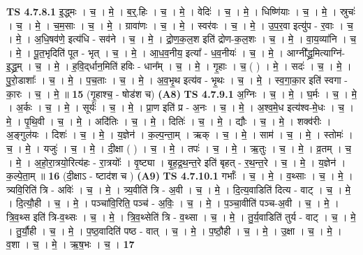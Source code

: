 \documentclass[17pt]{extarticle}
\begin{document}
                                \textbf{ TS 4.7.8.1} \newline
                  इ॒द्ध्मः । च॒ । मे॒ । ब॒र्॒.हिः । च॒ । मे॒ । वेदिः॑ । च॒ । मे॒ । धिष्णि॑याः । च॒ । मे॒ । स्रुचः॑ । च॒ । मे॒ । च॒म॒साः । च॒ । मे॒ । ग्रावा॑णः । च॒ । मे॒ । स्वर॑वः । च॒ । मे॒ । उ॒प॒र॒वा इत्यु॑प - र॒वाः । च॒ । मे॒ । अ॒धि॒षव॑णे॒ इत्य॑धि - सव॑ने । च॒ । मे॒ । द्रो॒ण॒क॒ल॒श इति॑ द्रोण-क॒ल॒शः । च॒ । मे॒ । वा॒य॒व्या॑नि । च॒ । मे॒ । पू॒त॒भृदिति॑ पूत - भृत् । च॒ । मे॒ । आ॒ध॒व॒नीय॒ इत्या᳚ - ध॒व॒नीयः॑ । च॒ । मे॒ । आग्नी᳚द्ध्र॒मित्याग्नि॑-इ॒द्ध्र॒म् । च॒ । मे॒ । ह॒वि॒द्‌र्धान॒मिति॑ हविः - धान᳚म् । च॒ । मे॒ । गृ॒हाः । च॒ ( ) । मे॒ । सदः॑ । च॒ । मे॒ । पु॒रो॒डाशाः᳚ । च॒ । मे॒ । प॒च॒ताः । च॒ । मे॒ । अ॒व॒भृ॒थ इत्य॑व - भृ॒थः । च॒ । मे॒ । स्व॒गा॒का॒र इति॑ स्वगा - का॒रः । च॒ । मे॒ ॥ \textbf{  15} \newline
                  \newline
                      (गृ॒हाश्च॒ - षोड॑श च)  \textbf{(A8)} \newline \newline
                                \textbf{ TS 4.7.9.1} \newline
                  अ॒ग्निः । च॒ । मे॒ । घ॒र्मः । च॒ । मे॒ । अ॒र्कः । च॒ । मे॒ । सूर्यः॑ । च॒ । मे॒ । प्रा॒ण इति॑ प्र - अ॒नः । च॒ । मे॒ । अ॒श्व॒मे॒ध इत्य॑श्व-मे॒धः । च॒ । मे॒ । पृ॒थि॒वी । च॒ । मे॒ । अदि॑तिः । च॒ । मे॒ । दितिः॑ । च॒ । मे॒ । द्यौः । च॒ । मे॒ । शक्व॑रीः । अ॒ङ्गुल॑यः । दिशः॑ । च॒ । मे॒ । य॒ज्ञेन॑ । क॒ल्प॒न्ता॒म् । ऋक् । च॒ । मे॒ । साम॑ । च॒ । मे॒ । स्तोमः॑ । च॒ । मे॒ । यजुः॑ । च॒ । मे॒ । दी॒क्षा ( ) । च॒ । मे॒ । तपः॑ । च॒ । मे॒ । ऋ॒तुः । च॒ । मे॒ । व्र॒तम् । च॒ । मे॒ । अ॒हो॒रा॒त्रयो॒रित्य॑हः - रा॒त्रयोः᳚ । वृ॒ष्ट्या । बृ॒ह॒द्र॒थ॒न्त॒रे इति॑ बृहत् - र॒थ॒न्त॒रे । च॒ । मे॒ । य॒ज्ञेन॑ । क॒ल्पे॒ता॒म् ॥ \textbf{  16 } \newline
                  \newline
                      (दी॒क्षाऽ - ष्टाद॑श च )  \textbf{(A9)} \newline \newline
                                \textbf{ TS 4.7.10.1} \newline
                  गर्भाः᳚ । च॒ । मे॒ । व॒थ्साः । च॒ । मे॒ । त्र्यवि॒रिति॑ त्रि - अविः॑ । च॒ । मे॒ । त्र्य॒वीति॑ त्रि - अ॒वी । च॒ । मे॒ । दि॒त्य॒वाडिति॑ दित्य - वाट् । च॒ । मे॒ । दि॒त्यौ॒ही । च॒ । मे॒ । पञ्चा॑वि॒रिति॒ पञ्च॑ - अ॒विः॒ । च॒ । मे॒ । प॒ञ्चा॒वीति॑ पञ्च-अ॒वी । च॒ । मे॒ । त्रि॒व॒थ्स इति॑ त्रि-व॒थ्सः । च॒ । मे॒ । त्रि॒व॒थ्सेति॑ त्रि - व॒थ्सा । च॒ । मे॒ । तु॒र्य॒वाडिति॑ तुर्य - वाट् । च॒ । मे॒ । तु॒र्यौ॒ही । च॒ । मे॒ । प॒ष्ठ॒वादिति॑ पष्ठ - वात् । च॒ । मे॒ । प॒ष्ठौ॒ही । च॒ । मे॒ । उ॒क्षा । च॒ । मे॒ । व॒शा । च॒ । मे॒ । ऋ॒ष॒भः । च॒ । \textbf{  17} \newline
\end{document}
